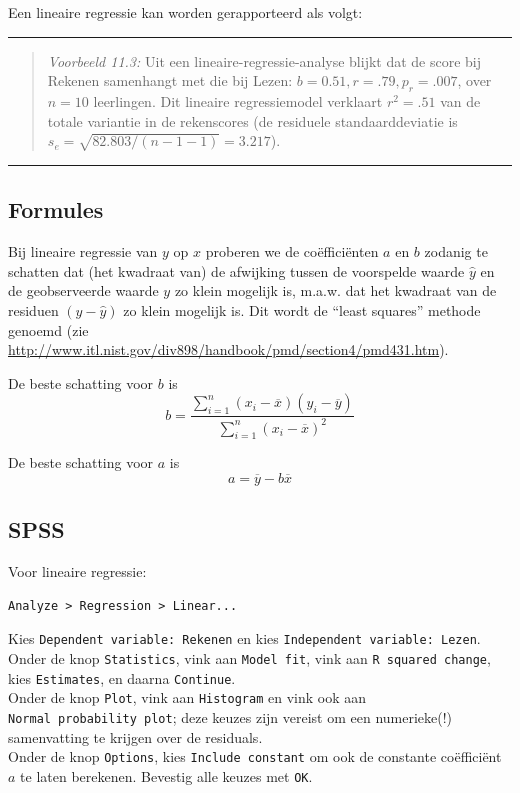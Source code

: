 \documentclass[
]{book}
\begin{document}
Een lineaire regressie kan worden gerapporteerd als volgt:

\begin{center}\rule{0.5\linewidth}{0.5pt}\end{center}

\begin{quote}
\emph{Voorbeeld 11.3:}
Uit een lineaire-regressie-analyse blijkt dat de score bij Rekenen
samenhangt met die bij Lezen: \(b=0.51, r=.79, p_r=.007\), over \(n=10\)
leerlingen. Dit lineaire regressiemodel verklaart \(r^2=.51\) van de
totale variantie in de rekenscores (de residuele standaarddeviatie is
\(s_e= \sqrt{82.803/(n-1-1)} = 3.217\)).
\end{quote}

\begin{center}\rule{0.5\linewidth}{0.5pt}\end{center}

\hypertarget{sec:regressie-formules}{%
\subsection{Formules}\label{sec:regressie-formules}}

Bij lineaire regressie van \(y\) op \(x\) proberen we de coëfficiënten \(a\)
en \(b\) zodanig te schatten dat (het kwadraat van) de afwijking tussen de
voorspelde waarde \(\hat{y}\) en de geobserveerde waarde \(y\) zo klein
mogelijk is, m.a.w. dat het kwadraat van de residuen \((y-\hat{y})\) zo
klein mogelijk is. Dit wordt de ``least squares'' methode genoemd (zie
\url{http://www.itl.nist.gov/div898/handbook/pmd/section4/pmd431.htm}).

De beste schatting voor \(b\) is
\[b = \frac{ \sum_{i=1}^n (x_i-\overline{x})(y_i-\overline{y}) } { \sum_{i=1}^n (x_i-\overline{x})^2 }\]

De beste schatting voor \(a\) is \[a = \overline{y} - b \overline{x}\]

\hypertarget{spss-6}{%
\subsection{SPSS}\label{spss-6}}

Voor lineaire regressie:

\begin{verbatim}
Analyze > Regression > Linear...
\end{verbatim}

Kies \texttt{Dependent\ variable:\ Rekenen} en kies
\texttt{Independent\ variable:\ Lezen}. Onder de knop \texttt{Statistics}, vink aan
\texttt{Model\ fit}, vink aan \texttt{R\ squared\ change}, kies \texttt{Estimates}, en daarna
\texttt{Continue}.\\
Onder de knop \texttt{Plot}, vink aan \texttt{Histogram} en vink ook aan
\texttt{Normal\ probability\ plot}; deze keuzes zijn vereist om een numerieke(!)
samenvatting te krijgen over de residuals.\\
Onder de knop \texttt{Options}, kies \texttt{Include\ constant} om ook de constante
coëfficiënt \(a\) te laten berekenen. Bevestig alle keuzes met \texttt{OK}.
\end{document}
